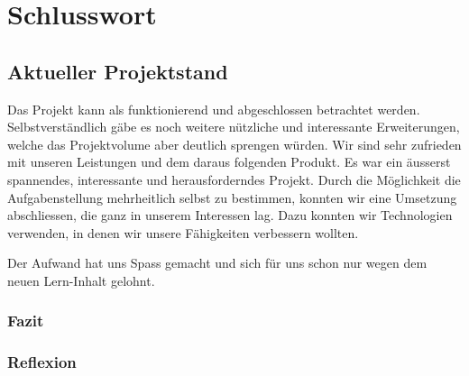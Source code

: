 
\chapter{Schlusswort}
\label{chap:Schlusswort}
\section{Aktueller Projektstand}
Das Projekt kann als funktionierend und abgeschlossen betrachtet werden. Selbstverständlich gäbe es noch weitere nützliche und interessante Erweiterungen, welche das Projektvolume aber deutlich sprengen würden.
Wir sind sehr zufrieden mit unseren Leistungen und dem daraus folgenden Produkt. Es war ein äusserst spannendes, interessante und herausforderndes Projekt. Durch die Möglichkeit die Aufgabenstellung mehrheitlich selbst zu bestimmen, konnten wir eine Umsetzung abschliessen, die ganz in unserem Interessen lag. Dazu konnten wir Technologien verwenden, in denen wir unsere Fähigkeiten verbessern wollten.

Der Aufwand hat uns Spass gemacht und sich für uns schon nur wegen dem neuen Lern-Inhalt gelohnt.

\subsection{Fazit}






\subsection{Reflexion}
